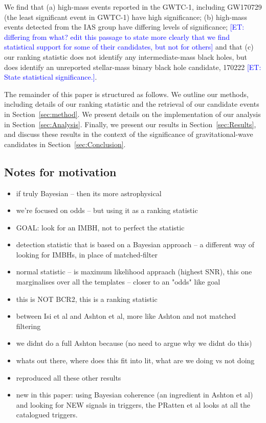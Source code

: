 \documentclass[%
 nofootinbib,
 amsmath,amssymb,
 aps,
 twocolumn
]{revtex4-2}
\newcommand{\et}[1]{\textcolor{blue}{[ET: #1]}}
\begin{document}
We find that (a) high-mass events reported in the GWTC-1, including GW170729 (the least significant event in GWTC-1) have high significance; (b) high-mass events detected from the IAS group have differing levels of significance; \et{differing from what? edit this passage to state more clearly that we find statistical support for some of their candidates, but not for others} and that (c) our ranking statistic does not identify any intermediate-mass black holes, but does identify an unreported stellar-mass binary black hole candidate, 170222 \et{State statistical significance.}.

The remainder of this paper is structured as follows. We outline our methods, including details of our ranking statistic and the retrieval of our candidate events in Section~\ref{sec:method}. We present details on the implementation of our analysis in Section~\ref{sec:Analysis}. Finally, we present our results in Section~\ref{sec:Results}, and discuss these results in the context of the significance of gravitational-wave candidates in Section~\ref{sec:Conclusion}.


\subsection{Notes for motivation}
\begin{itemize}
    \item if truly Bayesian -- then its more astrophysical 
    \item we're focused on odds -- but using it as a ranking statistic
    \item GOAL: look for an IMBH, not to perfect the statistic     
    \item  detection statistic that is based on a Bayesian approach -- a different way of looking for IMBHs, in place of matched-filter
    \item normal statistic -- is maximum likelihood appraach (highest SNR), this one marginalises over all the templates -- closer to an "odds" like goal
    \item this is NOT BCR2, this is a ranking statistic 
    \item between Isi et al and Ashton et al,  more like Ashton and not matched filtering 
    \item we didnt do a full Ashton because (no need to argue why we didnt do this)
    \item whats out there, where does this fit into lit, what are we doing vs not doing 
    \item  reproduced all these other results 
    \item new in this paper: using Bayesian coherence (an ingredient in Ashton et al) and looking for NEW signals in triggers, the PRatten et al looks at all the catalogued triggers. 
\end{itemize}
\end{document}
